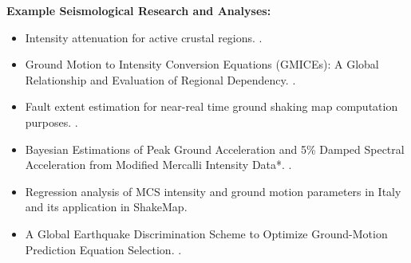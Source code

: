 \documentclass[letterpaper,10pt,english]{sphinxmanual}
\begin{document}
\textbf{Example Seismological Research and Analyses:}
\begin{itemize}
\item {} 
Intensity attenuation for active crustal regions. {\hyperref[references:allen2012]{}}.

\item {} 
Ground Motion to Intensity Conversion Equations (GMICEs): A Global
Relationship and Evaluation of Regional Dependency. {\hyperref[references:caprio2015]{}}.

\item {} 
Fault extent estimation for near-real time ground shaking map
computation purposes. {\hyperref[references:convertito2011]{}}.

\item {} 
Bayesian Estimations of Peak Ground Acceleration and 5\% Damped
Spectral Acceleration from Modified Mercalli Intensity Data*.
{\hyperref[references:ebel2003]{}}.

\item {} 
Regression analysis of MCS intensity and ground motion parameters
in Italy and its application in ShakeMap. {\hyperref[references:faenza2010]{}}

\item {} 
A Global Earthquake Discrimination Scheme to Optimize Ground-Motion
Prediction Equation Selection. {\hyperref[references:garcia2012b]{}}.

\end{itemize}
\end{document}
